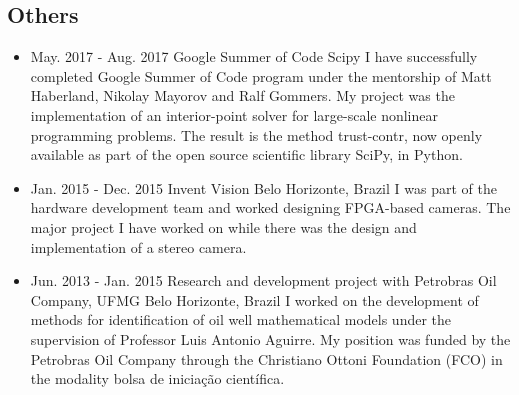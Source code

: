 \documentclass[10pt,A4]{article} %
\begin{document}
\subsection{Others}
\begin{itemize}
  

    \item {}
    { May. 2017 -   Aug. 2017 }
    { Google Summer of Code }
    { Scipy }
    { I have successfully completed Google Summer of Code program under the mentorship of Matt Haberland, Nikolay Mayorov and Ralf Gommers. My project was the implementation of an interior-point solver for large-scale nonlinear programming problems. The result is the method trust-contr, now openly available as part of the open source scientific library SciPy, in Python. }

    \item {}
    { Jan. 2015 -   Dec. 2015 }
    { Invent Vision }
    { Belo Horizonte, Brazil }
    { I was part of the hardware development team and worked designing FPGA-based cameras. The major project I have worked on while there was the design and implementation of a stereo camera. }

    \item {}
    { Jun. 2013 -   Jan. 2015 }
    { Research and development project with Petrobras Oil Company, UFMG }
    { Belo Horizonte, Brazil }
    { I worked on the development of methods for identification of oil well mathematical models under the supervision of Professor Luis Antonio Aguirre. My position was funded by the Petrobras Oil Company through the Christiano Ottoni Foundation (FCO) in the modality bolsa de iniciação científica. }

\end{itemize} 
\end{document}
